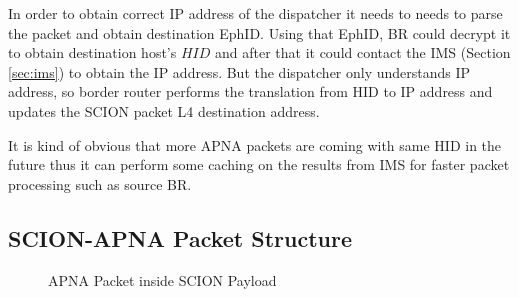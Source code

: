 In order to obtain correct IP address of the dispatcher it needs to needs to parse the packet and obtain destination EphID. Using that EphID, BR could decrypt it to obtain destination host's $HID$ and after that it could contact the IMS (Section \ref{sec:ims}) to obtain the IP address. But the dispatcher only understands IP address, so border router performs the translation from HID to IP address and updates the SCION packet L4 destination address.

It is kind of obvious that more APNA packets are coming with same HID in the future thus it can perform some caching on the results from IMS for faster packet processing such as source BR.

\subsection{SCION-APNA Packet Structure}
\begin{figure}[th!!]
\centering
\noindent
{}
\decoRule
\caption[APNA packet structure inside SCION]{APNA Packet inside SCION Payload}
\label{fig:apna_scion_pkt}
\end{figure}

